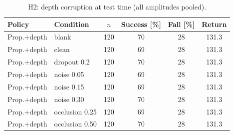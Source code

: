 \begin{table}[t]
\centering\caption{H2: depth corruption at test time (all amplitudes pooled).}\label{tab:h2}
\small\begin{tabular}{llcccc}\toprule
Policy & Condition & $n$ & Success [\%] & Fall [\%] & Return\\\midrule
Prop.+depth & blank & 120 & 70 & 28 & 131.3 \\
Prop.+depth & clean & 120 & 69 & 28 & 131.3 \\
Prop.+depth & dropout 0.2 & 120 & 70 & 28 & 131.3 \\
Prop.+depth & noise 0.05 & 120 & 69 & 28 & 131.3 \\
Prop.+depth & noise 0.15 & 120 & 69 & 28 & 131.3 \\
Prop.+depth & noise 0.30 & 120 & 70 & 28 & 131.3 \\
Prop.+depth & occlusion 0.25 & 120 & 69 & 28 & 131.3 \\
Prop.+depth & occlusion 0.50 & 120 & 70 & 28 & 131.3 \\
\bottomrule\end{tabular}\end{table}
